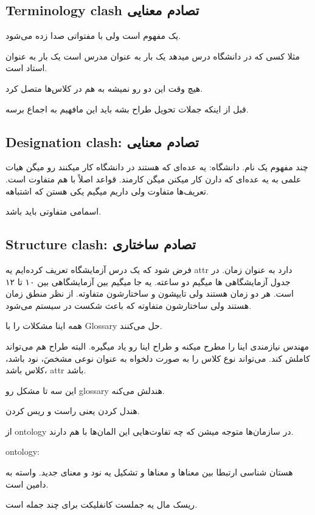 \subsection{Terminology clash تصادم معنایی}

یک مفهوم است ولی با مفتواتی صدا زده می‌شود. 

مثلا کسی که در دانشگاه درس میدهد یک بار به عنوان مدرس است یک بار به عنوان استاد
است.

هیچ وقت این دو رو نمیشه به هم در کلاس‌ها متصل کرد.

قبل از اینکه جملات تحویل طراح بشه باید این مافهیم به اجماع برسه.

\subsection{Designation clash: تصادم معنایی}

چند مفهوم یک نام. دانشگاه: یه عده‌ای که هستند در دانشگاه کار میکنند رو میگن هیات
علمی به یه عده‌ای که دارن کار میکنن میگن کارمند. قواعد اصلاً با هم متفاوت است.
تعریف‌ها متفاوت ولی داریم میگیم یکی هستن که اشتباهه.

اسمامی متفاوتی باید باشد.

\subsection{Structure clash: تصادم ساختاری}

فرض شود که یک درس آزمایشگاه تعریف کرده‌ایم یه attr دارد به عنوان زمان. در جدول
آزمایشگاهی ها میگیم دو ساعته. یه جا میگیم بین آزمایشگاهی بین ۱۰ تا ۱۲ است. هر دو
زمان هستند ولی تایپشون و ساختارشون متفاوته. از نظر منطق زمان هستند ولی ساختارشون
متفاوته که باعث شکست در سیستم می‌شود.

همه اینا مشکلات را با Glossary حل می‌کنند.

مهندس نیازمندی اینا را مطرح میکنه و طراح اینا رو یاد میگیره. البته طراح هم
می‌تواند کاملش کند. می‌تواند نوع کلاس را به صورت دلخواه به عنوان نوعی مشخصَ، نود
باشد، کلاس باشد، attr باشد.

این سه تا مشکل رو glossary هندلش می‌کنه.

هندل کردن یعنی راست و ریس کردن.

از ontology در سازمان‌ها متوجه میشن که چه تفاوت‌هایی این المان‌ها با هم دارند.

ontology:

هستان شناسی ارتبطا بین معنا‌ها و معنا‌ها و تشکیل یه نود و معنای جدید. واسته به
دامین است.

ریسک مال یه جملست
کانفلیکت برای چند جمله است.

